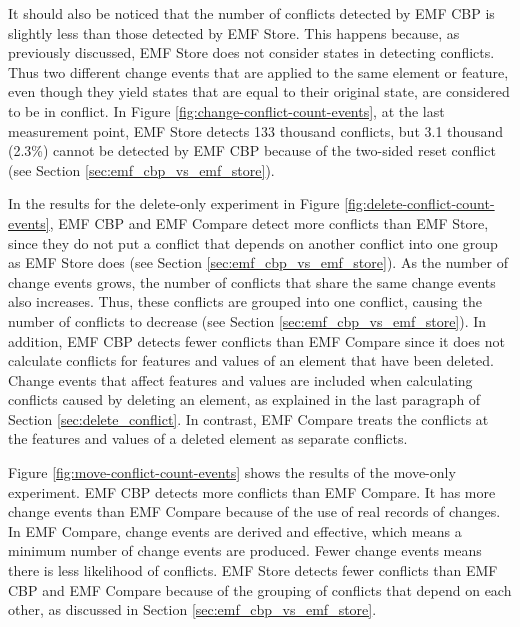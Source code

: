 It should also be noticed that the number of conflicts detected by EMF CBP is slightly less than those detected by EMF Store. This happens because, as previously discussed, EMF Store does not consider states in detecting conflicts. Thus two different change events that are applied to the same element or feature, even though they yield states that are equal to their original state, are considered to be in conflict. In Figure \ref{fig:change-conflict-count-events}, at the last measurement point, EMF Store detects 133 thousand conflicts, but 3.1 thousand (2.3\%) cannot be detected by EMF CBP because of the two-sided reset conflict (see Section \ref{sec:emf_cbp_vs_emf_store}).

In the results for the delete-only experiment in Figure \ref{fig:delete-conflict-count-events}, EMF CBP and EMF Compare detect more conflicts than EMF Store, since they do not put a conflict that depends on another conflict into one group as EMF Store does (see Section \ref{sec:emf_cbp_vs_emf_store}). As the number of change events grows, the number of conflicts that share the same change events also increases. Thus, these conflicts are grouped into one conflict, causing the number of conflicts to decrease (see Section \ref{sec:emf_cbp_vs_emf_store}). In addition, EMF CBP detects fewer conflicts than EMF Compare since it does not calculate conflicts for features and values of an element that have been deleted. Change events that affect features and values are included when calculating conflicts caused by deleting an element, as explained in the last paragraph of Section \ref{sec:delete_conflict}. In contrast, EMF Compare treats the conflicts at the features and values of a deleted element as separate conflicts.

Figure \ref{fig:move-conflict-count-events} shows the results of the move-only experiment. EMF CBP detects more conflicts than EMF Compare. It has more change events than EMF Compare because of the use of real records of changes. In EMF Compare, change events are derived and effective, which means a minimum number of change events are produced. Fewer change events means there is less likelihood of conflicts. EMF Store detects fewer conflicts than EMF CBP and EMF Compare because of the grouping of conflicts that depend on each other, as discussed in Section \ref{sec:emf_cbp_vs_emf_store}.

